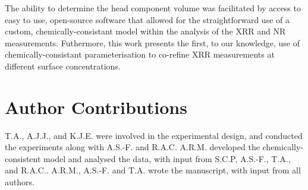 \documentclass[amsmath,amssymb,twocolumn,superscriptaddress]{revtex4-1}
\begin{document}
The ability to determine the head component volume was facilitated by access to easy to use, open-source software that allowed for the straightforward use of a custom, chemically-consistant model within the analysis of the XRR and NR measurements. Futhermore, this work presents the first, to our knowledge, use of chemically-consistant parameterisation to co-refine XRR measurements at different surface concentrations.

\section{Author Contributions}
T.A., A.J.J., and K.J.E. were involved in the experimental design, and conducted the experiments along with A.S.-F. and R.A.C.
A.R.M. developed the chemically-consistent model and analysed the data, with input from S.C.P, A.S.-F., T.A., and R.A.C..
A.R.M., A.S.-F. and T.A. wrote the manuscript, with input from all authors.


\end{document}
